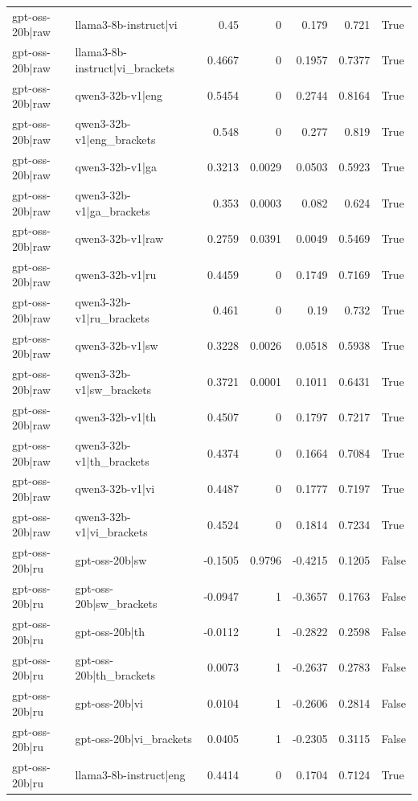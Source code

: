 \begin{table}
\begin{tabular}{l l r r r r l}
gpt-oss-20b|raw & llama3-8b-instruct|vi & 0.45 & 0 & 0.179 & 0.721 & True \\
gpt-oss-20b|raw & llama3-8b-instruct|vi_brackets & 0.4667 & 0 & 0.1957 & 0.7377 & True \\
gpt-oss-20b|raw & qwen3-32b-v1|eng & 0.5454 & 0 & 0.2744 & 0.8164 & True \\
gpt-oss-20b|raw & qwen3-32b-v1|eng_brackets & 0.548 & 0 & 0.277 & 0.819 & True \\
gpt-oss-20b|raw & qwen3-32b-v1|ga & 0.3213 & 0.0029 & 0.0503 & 0.5923 & True \\
gpt-oss-20b|raw & qwen3-32b-v1|ga_brackets & 0.353 & 0.0003 & 0.082 & 0.624 & True \\
gpt-oss-20b|raw & qwen3-32b-v1|raw & 0.2759 & 0.0391 & 0.0049 & 0.5469 & True \\
gpt-oss-20b|raw & qwen3-32b-v1|ru & 0.4459 & 0 & 0.1749 & 0.7169 & True \\
gpt-oss-20b|raw & qwen3-32b-v1|ru_brackets & 0.461 & 0 & 0.19 & 0.732 & True \\
gpt-oss-20b|raw & qwen3-32b-v1|sw & 0.3228 & 0.0026 & 0.0518 & 0.5938 & True \\
gpt-oss-20b|raw & qwen3-32b-v1|sw_brackets & 0.3721 & 0.0001 & 0.1011 & 0.6431 & True \\
gpt-oss-20b|raw & qwen3-32b-v1|th & 0.4507 & 0 & 0.1797 & 0.7217 & True \\
gpt-oss-20b|raw & qwen3-32b-v1|th_brackets & 0.4374 & 0 & 0.1664 & 0.7084 & True \\
gpt-oss-20b|raw & qwen3-32b-v1|vi & 0.4487 & 0 & 0.1777 & 0.7197 & True \\
gpt-oss-20b|raw & qwen3-32b-v1|vi_brackets & 0.4524 & 0 & 0.1814 & 0.7234 & True \\
gpt-oss-20b|ru & gpt-oss-20b|sw & -0.1505 & 0.9796 & -0.4215 & 0.1205 & False \\
gpt-oss-20b|ru & gpt-oss-20b|sw_brackets & -0.0947 & 1 & -0.3657 & 0.1763 & False \\
gpt-oss-20b|ru & gpt-oss-20b|th & -0.0112 & 1 & -0.2822 & 0.2598 & False \\
gpt-oss-20b|ru & gpt-oss-20b|th_brackets & 0.0073 & 1 & -0.2637 & 0.2783 & False \\
gpt-oss-20b|ru & gpt-oss-20b|vi & 0.0104 & 1 & -0.2606 & 0.2814 & False \\
gpt-oss-20b|ru & gpt-oss-20b|vi_brackets & 0.0405 & 1 & -0.2305 & 0.3115 & False \\
gpt-oss-20b|ru & llama3-8b-instruct|eng & 0.4414 & 0 & 0.1704 & 0.7124 & True \\

\end{tabular}
\end{table}

